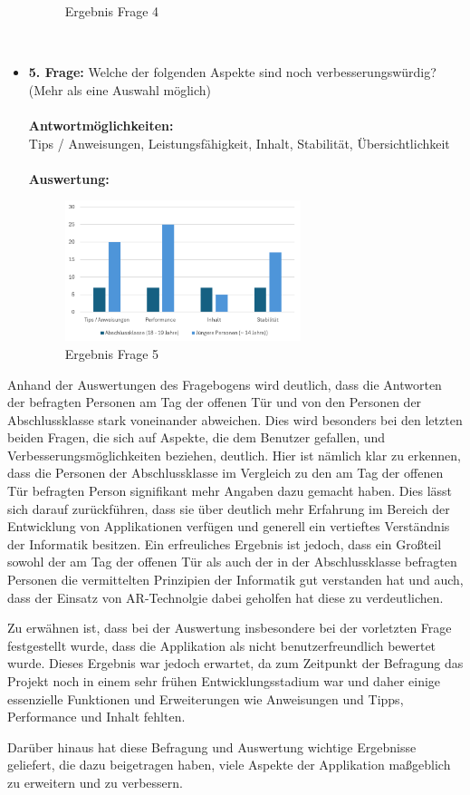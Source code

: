 \begin{itemize}
\begin{figure}[h]
        \caption{Ergebnis Frage 4}
        \label{fig:fr1}
    \end{figure}
    \\
    \item \textbf{5. Frage:} Welche der folgenden Aspekte sind noch verbesserungswürdig? (Mehr als eine Auswahl möglich)
    \\
    \\
    \textbf{Antwortmöglichkeiten:}\\
    Tips / Anweisungen, Leistungsfähigkeit, Inhalt, Stabilität, Übersichtlichkeit
    \\
    \\
    \textbf{Auswertung:}
    \begin{figure}[h]
        \centering
        \includegraphics[width=0.65\textwidth]{images/AuswertungFrage5}
        \caption{Ergebnis Frage 5}
        \label{fig:fr1}
    \end{figure}
\end{itemize}

Anhand der Auswertungen des Fragebogens wird deutlich, dass die Antworten der befragten Personen am Tag der offenen Tür
und von den Personen der Abschlussklasse stark voneinander abweichen. Dies wird besonders bei den letzten beiden Fragen,
die sich auf Aspekte, die dem Benutzer gefallen, und Verbesserungsmöglichkeiten beziehen, deutlich. Hier ist nämlich klar
zu erkennen, dass die Personen der Abschlussklasse im Vergleich zu den am Tag der offenen Tür befragten Person signifikant
mehr Angaben dazu gemacht haben. Dies lässt sich darauf zurückführen, dass sie über deutlich mehr Erfahrung im Bereich
der Entwicklung von Applikationen verfügen und generell ein vertieftes Verständnis der Informatik besitzen. Ein erfreuliches
Ergebnis ist jedoch, dass ein Großteil sowohl der am Tag der offenen Tür als auch der in der Abschlussklasse
befragten Personen die vermittelten Prinzipien der Informatik gut verstanden hat und auch, dass der Einsatz von AR-Technolgie
dabei geholfen hat diese zu verdeutlichen.

Zu erwähnen ist, dass bei der Auswertung insbesondere bei der vorletzten Frage festgestellt wurde, dass die Applikation
als nicht benutzerfreundlich bewertet wurde. Dieses Ergebnis war jedoch erwartet, da zum Zeitpunkt der Befragung das
Projekt noch in einem sehr frühen Entwicklungsstadium war und daher einige essenzielle Funktionen und Erweiterungen wie
Anweisungen und Tipps, Performance und Inhalt fehlten.

Darüber hinaus hat diese Befragung und Auswertung wichtige Ergebnisse geliefert, die dazu beigetragen haben, viele Aspekte
der Applikation maßgeblich zu erweitern und zu verbessern.